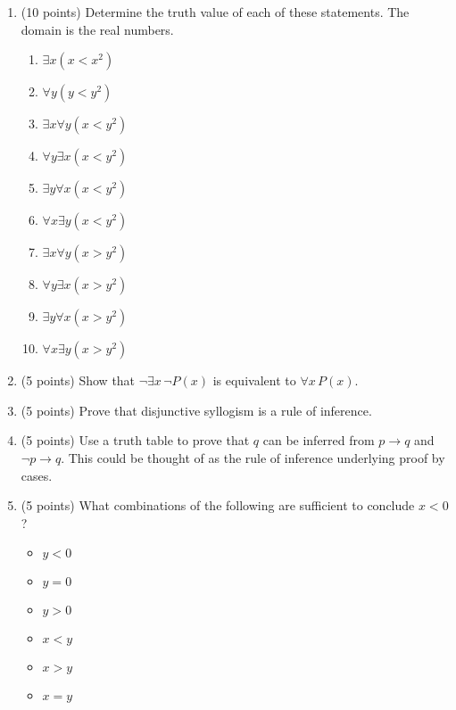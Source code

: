 \documentclass[12pt,fleqn]{article}
\begin{document}
\begin{enumerate}
\item (10 points) Determine the truth value of each of these
  statements.  The domain is the real numbers.

\begin{enumerate}
\item $\exists x (x < x^2)$

\item $\forall y (y < y^2)$

\item $\exists x \forall y (x < y^2)$

\item $\forall y \exists x (x < y^2)$

\item $\exists y \forall x (x < y^2)$

\item $\forall x \exists y (x < y^2)$

\item $\exists x \forall y (x > y^2)$

\item $\forall y \exists x (x > y^2)$

\item $\exists y \forall x (x > y^2)$

\item $\forall x \exists y (x > y^2)$
\end{enumerate}

\item (5 points) Show that $\neg \exists x \, \neg P(x)$ is equivalent
to $\forall x \, P(x)$.

\item (5 points) Prove that disjunctive syllogism is a rule of inference.

\item (5 points) Use a truth table to prove that $q$ can be inferred
  from $p \rightarrow q$ and $\neg p \rightarrow q$.  This could be thought
  of as the rule of inference underlying proof by cases.

\item (5 points) What combinations of the following are sufficient to
conclude $x < 0$?

\begin{itemize}
\item $y < 0$
\item $y = 0$
\item $y > 0$
\item $x < y$
\item $x > y$
\item $x = y$
\end{itemize}


\end{enumerate}
\end{document}
